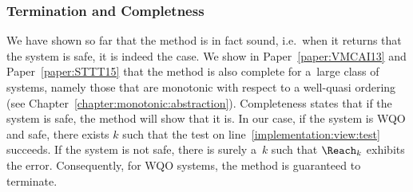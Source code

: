 \subsubsection*{Termination and Completness}
We have shown so far that the method is in fact sound, i.e.\ when it
returns that the system is safe, it is indeed the case.
%
%
We show in Paper~\ref{paper:VMCAI13} and Paper~\ref{paper:STTT15} that
the method is also complete for a~large class of systems, namely those
that are monotonic with respect to a well-quasi ordering (see
Chapter~\ref{chapter:monotonic:abstraction}).
%
%
%
Completeness states that if the system is safe, the method will show
that it is. In our case, if the system is WQO and safe, there exists
$k$ such that the test on line~\ref{implementation:view:test}
succeeds. If the system is not safe, there is surely a~$k$ such that
$\Reach_k$ exhibits the error. Consequently, for WQO systems, the
method is guaranteed to terminate.
%

\begin{comment}
Graph with downward-closure of R (=all reachable confs).
In case of Szymanski, no version of downward-closed R will not intersect with Bad.
Must be expressed in other ways (it is not downward-closed and hence: contexts)
\end{comment}
